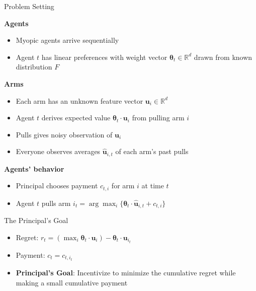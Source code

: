 \documentclass[serif]{beamer}
\begin{document}
\begin{frame}{Problem Setting}

\textbf{Agents}
\begin{itemize}
\item Myopic agents arrive sequentially
\item Agent $t$ has linear preferences with weight vector $\bm{\theta}_t\in \mathbb{R}^{d}$ drawn from known distribution $F$
\end{itemize}
\vspace{0.5cm}

\textbf{Arms}
\begin{itemize}
\item Each arm has an unknown feature vector $\bm{u}_i\in \mathbb{R}^{d}$
\item Agent $t$ derives expected value $\bm{\theta}_{t}\cdot \bm{u}_{i}$ from pulling arm $i$
\item Pulls gives noisy observation of $\bm{u}_i$ 
\item Everyone observes averages $\hat{\bm{u}}_{i,t}$ of each arm's past pulls
\end{itemize}

\vspace{0.5cm}
\textbf{Agents' behavior}
\begin{itemize}
\item Principal chooses payment $c_{t,i}$ for arm $i$ at time $t$
\item Agent $t$ pulls arm $i_t = \arg\max_{i}\{\bm{\theta}_{t}\cdot \hat{\bm{u}}_{i,t}+c_{t,i}\}$
\end{itemize}



\vspace{1cm}

\end{frame}

\begin{frame}{The Principal's Goal}

\vspace{1cm}
\begin{itemize}
\item Regret: $r_t = (\max_{i} \bm{\theta}_t \cdot \bm{u}_i) - \bm{\theta}_t \cdot \bm{u}_{i_t}$
\item Payment: $c_t = c_{t,i_t}$
\item \textbf{Principal's Goal}: Incentivize to minimize the cumulative regret while making a small cumulative payment
\end{itemize}

\end{frame}
\end{document}
